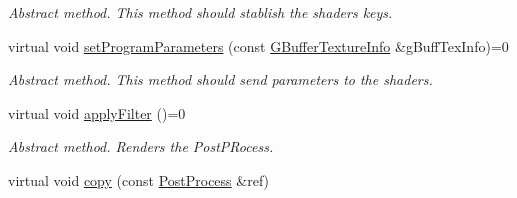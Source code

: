 \begin{DoxyCompactItemize}
\begin{DoxyCompactList}\small\item\em Abstract method. This method should stablish the shaders keys. \end{DoxyCompactList}\item 
\mbox{\label{class_geometry_engine_1_1_geometry_post_process_1_1_post_process_ae4bd80f5d0f0768fd4e2141a95ff5bb0}} 
virtual void \mbox{\hyperlink{class_geometry_engine_1_1_geometry_post_process_1_1_post_process_ae4bd80f5d0f0768fd4e2141a95ff5bb0}{set\+Program\+Parameters}} (const \mbox{\hyperlink{class_geometry_engine_1_1_g_buffer_texture_info}{G\+Buffer\+Texture\+Info}} \&g\+Buff\+Tex\+Info)=0
\begin{DoxyCompactList}\small\item\em Abstract method. This method should send parameters to the shaders. \end{DoxyCompactList}\item 
\mbox{\label{class_geometry_engine_1_1_geometry_post_process_1_1_post_process_acbd697b4103a9e8c897b8c073350e5a2}} 
virtual void \mbox{\hyperlink{class_geometry_engine_1_1_geometry_post_process_1_1_post_process_acbd697b4103a9e8c897b8c073350e5a2}{apply\+Filter}} ()=0
\begin{DoxyCompactList}\small\item\em Abstract method. Renders the Post\+P\+Rocess. \end{DoxyCompactList}\item 
virtual void \mbox{\hyperlink{class_geometry_engine_1_1_geometry_post_process_1_1_post_process_aba093c175b228894204e785a5a54e6e9}{copy}} (const \mbox{\hyperlink{class_geometry_engine_1_1_geometry_post_process_1_1_post_process}{Post\+Process}} \&ref)
\end{DoxyCompactItemize}
